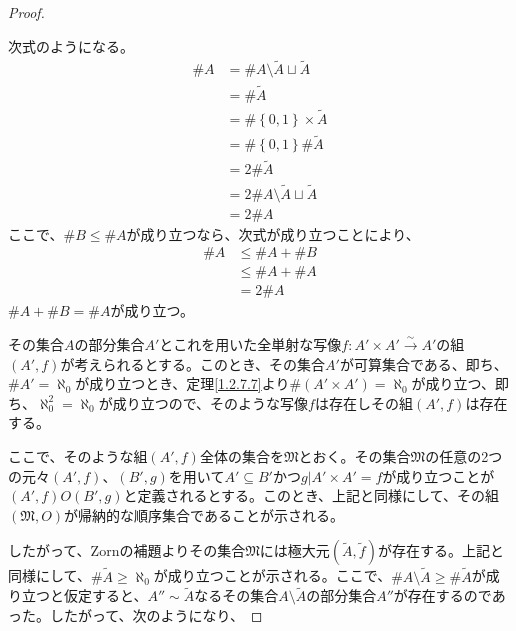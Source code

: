 \documentclass[dvipdfmx]{jsarticle}
\begin{document}
\begin{proof}
\begin{center}
\end{center}
次式のようになる。
\begin{align*}
\# A &= \# {A \setminus \widetilde{A} \sqcup \widetilde{A}}\\
&= \# \widetilde{A}\\
&= \# {\left\{ 0,1 \right\} \times \widetilde{A}}\\
&= \# \left\{ 0,1 \right\}\# \widetilde{A}\\
&= 2\# \widetilde{A}\\
&= 2\# {A \setminus \widetilde{A} \sqcup \widetilde{A}}\\
&= 2\# A
\end{align*}
ここで、$\# B \leq \# A$が成り立つなら、次式が成り立つことにより、
\begin{align*}
\# A &\leq \# A + \# B\\
&\leq \# A + \# A\\
&= 2\# A
\end{align*}
$\# A + \# B = \# A$が成り立つ。\par
その集合$A$の部分集合$A'$とこれを用いた全単射な写像$f:A' \times A'\overset{\sim}{\rightarrow}A'$の組$\left( A',f \right)$が考えられるとする。このとき、その集合$A'$が可算集合である、即ち、$\# A' = \aleph_{0}$が成り立つとき、定理\ref{1.2.7.7}より$\# \left( A' \times A' \right) = \aleph_{0}$が成り立つ、即ち、$\aleph_{0}^{2} = \aleph_{0}$が成り立つので、そのような写像$f$は存在しその組$\left( A',f \right)$は存在する。\par
ここで、そのような組$\left( A',f \right)$全体の集合を$\mathfrak{M}$とおく。その集合$\mathfrak{M}$の任意の2つの元々$\left( A',f \right)$、$\left( B',g \right)$を用いて$A' \subseteq B'$かつ$g|A' \times A' = f$が成り立つことが$\left( A',f \right)O\left( B',g \right)$と定義されるとする。このとき、上記と同様にして、その組$\left( \mathfrak{M,}O \right)$が帰納的な順序集合であることが示される。\par
したがって、Zornの補題よりその集合$\mathfrak{M}$には極大元$\left( \widetilde{A},\widetilde{f} \right)$が存在する。上記と同様にして、$\# \widetilde{A} \geq \aleph_{0}$が成り立つことが示される。ここで、$\# {A \setminus \widetilde{A}} \geq \# \widetilde{A}$が成り立つと仮定すると、$A'' \sim \widetilde{A}$なるその集合$A \setminus \widetilde{A}$の部分集合$A''$が存在するのであった。したがって、次のようになり、

\end{proof}
\end{document}
